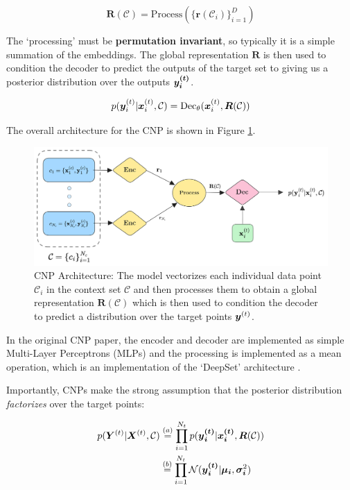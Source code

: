 \documentclass[../../main.tex]{subfiles}
\begin{document}
\begin{equation}
    \bm{R}(\mathcal{C}) = \text{Process}(\{ \bm{r}(\mathcal{C}_i) \}_{i=1}^D)
\end{equation}

The `processing' must be \textbf{permutation invariant}, so typically it is a simple summation of the embeddings. The global representation $\bm{R}$ is then used to condition the decoder to predict the outputs of the target set to giving us a posterior distribution over the outputs $\bm{y_i^{(t)}}$.

\begin{equation}
    p(\bm{y}_i^{(t)} | \bm{x}_i^{(t)}, \mathcal{C}) = \text{Dec}_\theta(\bm{x}_i^{(t)}, \bm{R}(\mathcal{C}))
\end{equation}

The overall architecture for the CNP is shown in Figure \ref{fig:cnp-architecture}.

\begin{figure}[H]
	\centering
	\includegraphics[height=0.3\textwidth]{./cnp.png}
	\caption{CNP Architecture: The model vectorizes each individual data point $\mathcal{C}_i$ in the context set $\mathcal{C}$ and then processes them to obtain a global representation $\bm{R}(\mathcal{C})$ which is then used to condition the decoder to predict a distribution over the target points $\bm{y}^{(t)}$.}
    \label{fig:cnp-architecture}
\end{figure}


In the original CNP paper, the encoder and decoder are implemented as simple Multi-Layer Perceptrons (MLPs) and the processing is implemented as a mean operation, which is an implementation of the `DeepSet' architecture \parencite{zaheer2018deep}.


Importantly, CNPs make the strong assumption that the posterior distribution \emph{factorizes} over the target points:

\begin{align}
    p(\bm{Y}^{(t)} | \bm{X}^{(t)}, \mathcal{C}) &\stackrel{(a)}{=} \prod_{i=1}^{N_t} p(\bm{{y}_i^{(t)}} | \bm{{x}_i^{(t)}}, \bm{R}(\mathcal{C})) \\ &\stackrel{(b)}{=} \prod_{i=1}^{N_t} \mathcal{N}(\bm{{y}_i^{(t)}} | \bm{\mu_i}, \bm{\sigma_i}^2) 
\end{align}
\end{document}
